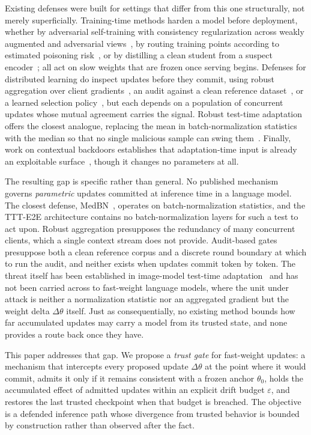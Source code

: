 \documentclass[journal]{IEEEtran}
\newcommand{\anchorp}{\theta_{0}}
\newcommand{\dtheta}{\Delta\theta}
\newcommand{\budget}{\varepsilon}
\begin{document}
Existing defenses were built for settings that differ from this one structurally,
not merely superficially. Training-time methods harden a model before deployment,
whether by adversarial self-training with consistency regularization across weakly
augmented and adversarial views~\cite{li2024ast}, by routing training points
according to estimated poisoning risk~\cite{bena2025risk}, or by distilling a clean
student from a suspect encoder~\cite{han2025mimic}; all act on slow weights that are
frozen once serving begins. Defenses for distributed learning do inspect updates
before they commit, using robust aggregation over client
gradients~\cite{blanchard2017krum,yin2018trimmed,yang2025scalesign,zukaib2026d3flids},
an audit against a clean reference dataset~\cite{basak2025dpad,nawshin2026concurrent},
or a learned selection policy~\cite{xu2026feddrlpd}, but each depends on a
population of concurrent updates whose mutual agreement carries the signal. Robust
test-time adaptation offers the closest analogue, replacing the mean in
batch-normalization statistics with the median so that no single malicious sample
can swing them~\cite{park2024medbn}. Finally, work on contextual backdoors
establishes that adaptation-time input is already an exploitable
surface~\cite{liu2025contextual}, though it changes no parameters at all.

The resulting gap is specific rather than general. No published mechanism governs
\emph{parametric} updates committed at inference time in a language model. The
closest defense, MedBN~\cite{park2024medbn}, operates on batch-normalization
statistics, and the TTT-E2E architecture contains no batch-normalization layers for
such a test to act upon. Robust aggregation presupposes the redundancy of many
concurrent clients, which a single context stream does not provide. Audit-based
gates presuppose both a clean reference corpus and a discrete round boundary at
which to run the audit, and neither exists when updates commit token by token. The
threat itself has been established in image-model test-time
adaptation~\cite{cong2024ttp,su2025realistic,hoang2024rip} and has not been carried
across to fast-weight language models, where the unit under attack is neither a
normalization statistic nor an aggregated gradient but the weight delta $\dtheta$
itself. Just as consequentially, no existing method bounds how far accumulated
updates may carry a model from its trusted state, and none provides a route back
once they have.

This paper addresses that gap. We propose a \emph{trust gate} for fast-weight
updates: a mechanism that intercepts every proposed update $\dtheta$ at the point
where it would commit, admits it only if it remains consistent with a frozen anchor
$\anchorp$, holds the accumulated effect of admitted updates within an explicit
drift budget $\budget$, and restores the last trusted checkpoint when that budget is
breached. The objective is a defended inference path whose divergence from trusted
behavior is bounded by construction rather than observed after the fact.
\end{document}
